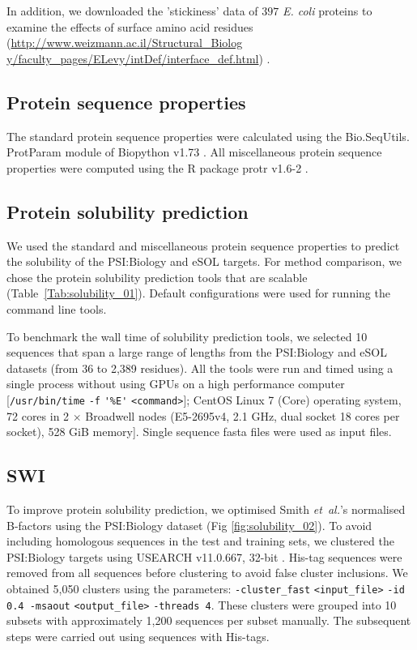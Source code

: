 In addition, we downloaded the 'stickiness’ data of $397$ \textit{E. coli} proteins to examine the effects of surface amino acid residues (\href{http://www.weizmann.ac.il/Structural\_Biology/faculty\_pages/ELevy/intDef/interface\_def.html}{http://www.weizmann.ac.il/Structural\_Biolog\\y/faculty\_pages/ELevy/intDef/interface\_def.html}) \citep{Levy2012-ct}.

\subsection{Protein sequence properties}
The standard protein sequence properties were calculated using the Bio.SeqUtils. ProtParam module of Biopython v1.73 \citep{Cock2009-jl}. All miscellaneous protein sequence properties were computed using the R package protr v1.6-2 \citep{Xiao2015-uw}. 

\subsection{Protein solubility prediction}
We used the standard and miscellaneous protein sequence properties to predict the solubility of the PSI:Biology and eSOL targets. For method comparison, we chose the protein solubility prediction tools that are scalable (Table~\ref{Tab:solubility_01}). Default configurations were used for running the command line tools.

To benchmark the wall time of solubility prediction tools, we selected 10 sequences that span a large range of lengths from the PSI:Biology and eSOL datasets (from 36 to 2,389 residues). All the tools were run and timed using a single process without using GPUs on a high performance computer [\verb|/usr/bin/time| \verb|-f| \verb|'%E'| \verb|<command>|]; CentOS Linux 7 (Core) operating system, 72 cores in 2 $\times$ Broadwell nodes (E5-2695v4, 2.1 GHz, dual socket 18 cores per socket), 528 GiB memory]. Single sequence fasta files were used as input files.


\subsection{SWI}
To improve protein solubility prediction, we optimised Smith {\it et~al.}’s normalised B-factors using the PSI:Biology dataset (Fig \ref{fig:solubility_02}). To avoid including homologous sequences in the test and training sets, we clustered the PSI:Biology targets using USEARCH v11.0.667, 32-bit \citep{Edgar2010-fc}. His-tag sequences were removed from all sequences before clustering to avoid false cluster inclusions. We obtained 5,050 clusters using the parameters: \verb|-cluster_fast| \verb|<input_file>| \verb|-id 0.4 -msaout| \verb|<output_file>| \verb|-threads 4|. These clusters were grouped into 10 subsets with approximately 1,200 sequences per subset manually. The subsequent steps were carried out using sequences with His-tags. 

